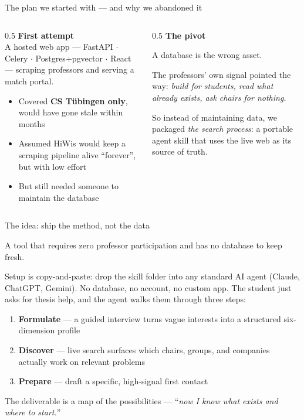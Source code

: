 \documentclass[11pt,aspectratio=169]{beamer}
\begin{document}
\begin{frame}{The plan we started with --- and why we abandoned it}
  \begin{columns}[T]
    \begin{column}{0.5\textwidth}
      \textbf{First attempt}\\[0.3em]
      A hosted web app --- FastAPI $\cdot$ Celery $\cdot$ Postgres+pgvector
      $\cdot$ React --- scraping professors and serving a match portal.
      \smallskip
      \begin{itemize}
        \item Covered \textbf{CS Tübingen only}, would have gone stale within months
        \item Assumed HiWis would keep a scraping pipeline alive ``forever'', but with low effort
        \item But still needed someone to maintain the database
      \end{itemize}
    \end{column}
    \begin{column}{0.5\textwidth}
      \textbf{The pivot}\\[0.3em]
      \begin{center}
        \alert{\large A database is the wrong asset.}
      \end{center}
      \smallskip
      The professors' own signal pointed the way: \emph{build for students,
      read what already exists, ask chairs for nothing.}
      \smallskip

      So instead of maintaining data, we packaged \emph{the search process}:
    a portable agent skill that uses the live web as its source of truth.
    \end{column}
  \end{columns}
\end{frame}

\begin{frame}{The idea: ship the method, not the data}
  \begin{center}
    A tool that requires \alert{zero professor participation} and has
    \alert{no database to keep fresh}.
  \end{center}
  Setup is copy-and-paste: drop the skill folder into any standard AI agent
  (Claude, ChatGPT, Gemini). No database, no account, no custom app. The student
  just asks for thesis help, and the agent \alert{walks them through three steps}:
  \begin{enumerate}
    \item \textbf{Formulate} --- a guided interview turns vague interests into
      a structured six-dimension profile
    \item \textbf{Discover} --- live search surfaces which chairs, groups, and
      companies actually work on relevant problems
    \item \textbf{Prepare} --- draft a specific, high-signal first contact
  \end{enumerate}
  \smallskip
  The deliverable is a \alert{map of the possibilities} --- ``\emph{now I know
  what exists and where to start.}''
\end{frame}
\end{document}

